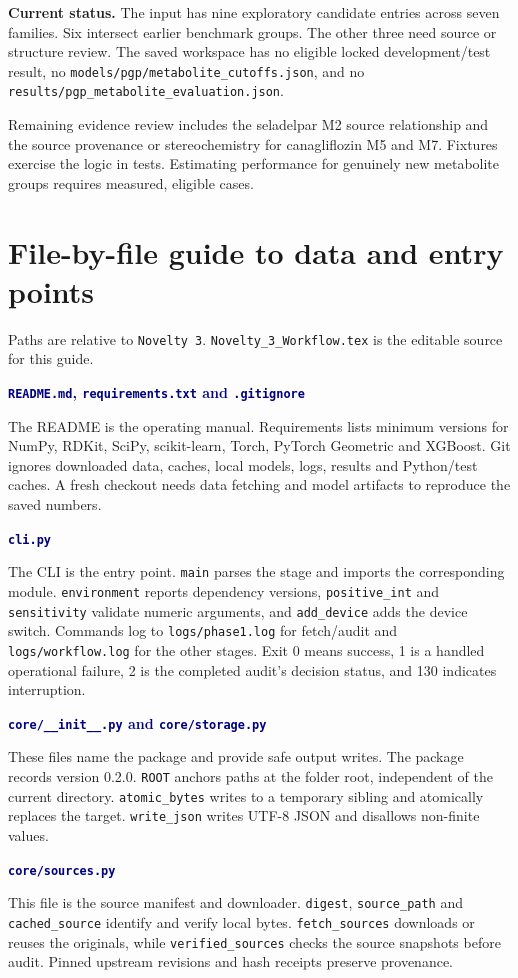 \documentclass[11pt,a4paper]{article}
\newcommand{\code}[1]{\nolinkurl{#1}}
\newcommand{\cmd}[1]{\texttt{#1}}
\newcommand{\lead}[1]{\par\smallskip\textbf{\textcolor{Navy}{#1}}\par\nobreak}
\newcommand{\pagehead}[1]{\clearpage\section{#1}}
\newcommand{\callout}[1]{\par\smallskip\noindent\colorbox{Pale}{\parbox{\dimexpr\linewidth-2\fboxsep\relax}{\vspace{3pt}#1\vspace{3pt}}}\par\smallskip}
\begin{document}
\callout{\textbf{Current status.} The input has nine exploratory candidate entries across seven families. Six intersect earlier benchmark groups. The other three need source or structure review. The saved workspace has no eligible locked development/test result, no \code{models/pgp/metabolite_cutoffs.json}, and no \code{results/pgp_metabolite_evaluation.json}.}

Remaining evidence review includes the seladelpar M2 source relationship and the source provenance or stereochemistry for canagliflozin M5 and M7. Fixtures exercise the logic in tests. Estimating performance for genuinely new metabolite groups requires measured, eligible cases.


\pagehead{File-by-file guide to data and entry points}\label{sec:files}
Paths are relative to \cmd{Novelty 3}. \code{Novelty_3_Workflow.tex} is the editable source for this guide.

\lead{\code{README.md}, \code{requirements.txt} and \code{.gitignore}}
The README is the operating manual. Requirements lists minimum versions for NumPy, RDKit, SciPy, scikit-learn, Torch, PyTorch Geometric and XGBoost. Git ignores downloaded data, caches, local models, logs, results and Python/test caches. A fresh checkout needs data fetching and model artifacts to reproduce the saved numbers.

\lead{\code{cli.py}}
The CLI is the entry point. \code{main} parses the stage and imports the corresponding module. \code{environment} reports dependency versions, \code{positive_int} and \code{sensitivity} validate numeric arguments, and \code{add_device} adds the device switch. Commands log to \code{logs/phase1.log} for fetch/audit and \code{logs/workflow.log} for the other stages. Exit 0 means success, 1 is a handled operational failure, 2 is the completed audit's decision status, and 130 indicates interruption.

\lead{\code{core/__init__.py} and \code{core/storage.py}}
These files name the package and provide safe output writes. The package records version 0.2.0. \code{ROOT} anchors paths at the folder root, independent of the current directory. \code{atomic_bytes} writes to a temporary sibling and atomically replaces the target. \code{write_json} writes UTF-8 JSON and disallows non-finite values.

\lead{\code{core/sources.py}}
This file is the source manifest and downloader. \code{digest}, \code{source_path} and \code{cached_source} identify and verify local bytes. \code{fetch_sources} downloads or reuses the originals, while \code{verified_sources} checks the source snapshots before audit. Pinned upstream revisions and hash receipts preserve provenance.
\end{document}
